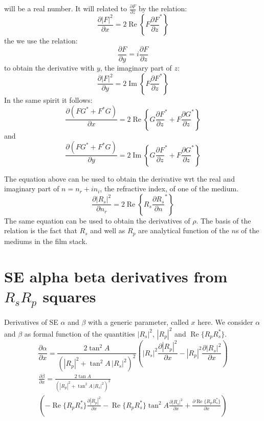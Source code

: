 \documentclass{article}
\begin{document}
will be a real number. It will related to $\frac{\partial F}{\partial z}$ by the relation:
\begin{equation}
    \frac{\partial |F|^2}{\partial x} = 2 \operatorname{Re}\left\{F \frac{\partial F}{\partial z}^\ast\right\}
\end{equation}
the we use the relation:
\begin{equation*}
    \frac{\partial F}{\partial y} = i \frac{\partial F}{\partial z}
\end{equation*}
to obtain the derivative with $y$, the imaginary part of $z$:
\begin{equation}
    \frac{\partial |F|^2}{\partial y} = 2 \operatorname{Im}\left\{F \frac{\partial F}{\partial z}^\ast\right\}
\end{equation}
In the same spirit it follows:
\begin{equation}
    \frac{\partial \left( F G^\ast+F^\ast G \right)}{\partial x} = 2 \operatorname{Re}\left\{G \frac{\partial F}{\partial z}^\ast + F \frac{\partial G}{\partial z}^\ast\right\}
\end{equation}
and
\begin{equation}
    \frac{\partial \left( F G^\ast+F^\ast G \right)}{\partial y} = 2 \operatorname{Im}\left\{G \frac{\partial F}{\partial z}^\ast + F \frac{\partial G}{\partial z}^\ast\right\}
\end{equation}

The equation above can be used to obtain the derivative wrt the real and imaginary part of $n = n_r + i n_i$, the refractive index, of one of the medium.
\begin{equation*}
    \frac{\partial |R_s|^2}{\partial n_r} = 2 \operatorname{Re}\left\{R_s \frac{\partial R_s}{\partial n}^\ast\right\}
\end{equation*}
The same equation can be used to obtain the derivatives of $\rho$. The basis of the relation is the fact that $R_s$ and well as $R_p$ are analytical function of the $n$s of the mediums in the film stack.

\section{SE alpha beta derivatives from $R_s R_p$ squares}
Derivatives of SE $\alpha$ and $\beta$ with a generic parameter, called $x$ here. We consider $\alpha$ and $\beta$ as formal function of the quantities $|R_s|^2$, $|R_p|^2$ and $\operatorname{Re}\{R_p R_s^\ast\}$.
\begin{equation}
\frac{\partial \alpha}{\partial x} = \frac{2 \tan^2 A}{\left( |R_p|^2 + \tan^2 A \, |R_s|^2 \right)^2} \left( |R_s|^2 \frac{\partial |R_p|^2}{\partial x} - |R_p|^2 \frac{\partial |R_s|^2}{\partial x}\right)
\end{equation}
\begin{multline}
\frac{\partial \beta}{\partial x} = \frac{2 \tan A}{\left( |R_p|^2 + \tan^2 A \, |R_s|^2 \right)^2} \\ \left( - \operatorname{Re}\{R_p R_s^\ast\} \frac{\partial |R_p|^2}{\partial x} - \operatorname{Re}\{R_p R_s^\ast\} \tan^2 A \frac{\partial |R_s|^2}{\partial x} + \frac{\partial \operatorname{Re}\{R_p R_s^\ast\}}{\partial x}\right)
\end{multline}
\end{document}
